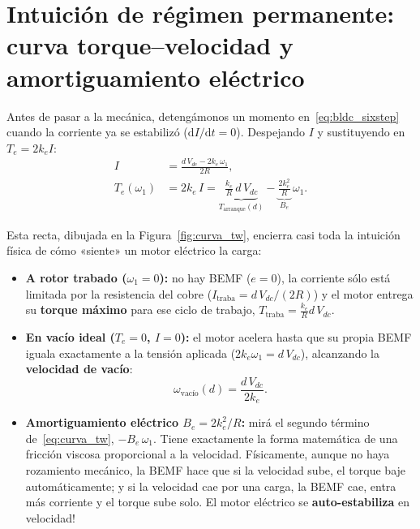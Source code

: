 \documentclass[11pt,a4paper,oneside]{book}
\newcommand{\dd}{\mathrm{d}}
\begin{document}
\section{Intuición de régimen permanente: curva torque--velocidad y amortiguamiento eléctrico}

Antes de pasar a la mecánica, detengámonos un momento en~\eqref{eq:bldc_sixstep}
cuando la corriente ya se estabilizó ($\dd I/\dd t = 0$). Despejando $I$ y
sustituyendo en $T_e = 2k_e I$:
\begin{align}
  I &= \frac{d\,V_{dc} - 2k_e\,\omega_1}{2R}, \\[4pt]
  T_e(\omega_1) &= 2k_e\,I
                 = \underbrace{\frac{k_e}{R}\,d\,V_{dc}}_{T_{\text{arranque}}(d)}
                 - \underbrace{\frac{2k_e^2}{R}}_{B_e}\,\omega_1.
  \label{eq:curva_tw}
\end{align}

Esta recta, dibujada en la Figura~\ref{fig:curva_tw}, encierra casi toda la
intuición física de cómo «siente» un motor eléctrico la carga:
\begin{itemize}
  \item \textbf{A rotor trabado ($\omega_1 = 0$):} no hay BEMF ($e = 0$), la
        corriente sólo está limitada por la resistencia del cobre
        ($I_{\text{traba}} = d\,V_{dc}/(2R)$) y el motor entrega su \textbf{torque
        máximo} para ese ciclo de trabajo, $T_{\text{traba}} = \frac{k_e}{R}d\,V_{dc}$.
  \item \textbf{En vacío ideal ($T_e = 0$, $I = 0$):} el motor acelera hasta que
        su propia BEMF iguala exactamente a la tensión aplicada ($2k_e\omega_1 = d\,V_{dc}$),
        alcanzando la \textbf{velocidad de vacío}:
        \[
          \omega_{\text{vacío}}(d) = \frac{d\,V_{dc}}{2k_e}.
        \]
  \item \textbf{Amortiguamiento eléctrico $B_e = 2k_e^2/R$:} mirá el segundo
        término de~\eqref{eq:curva_tw}, $-B_e\,\omega_1$. Tiene exactamente la
        forma matemática de una fricción viscosa proporcional a la velocidad.
        Físicamente, aunque no haya rozamiento mecánico, la BEMF hace que si la
        velocidad sube, el torque baje automáticamente; y si la velocidad cae
        por una carga, la BEMF cae, entra más corriente y el torque sube solo.
        El motor eléctrico se \textbf{auto-estabiliza} en velocidad!
\end{itemize}
\end{document}
